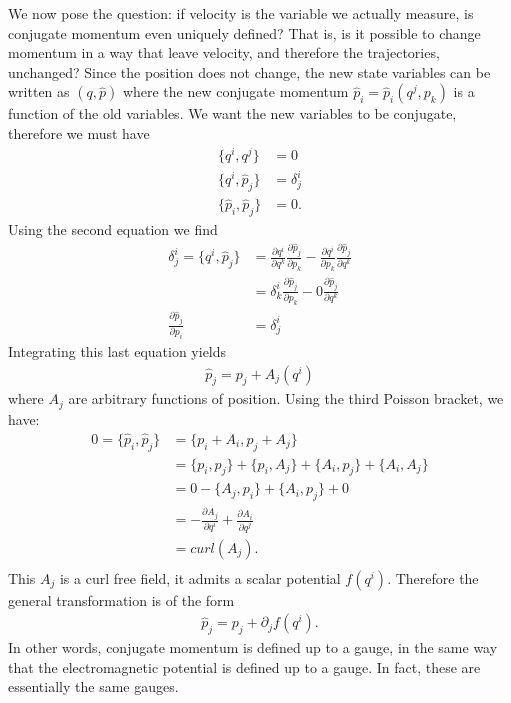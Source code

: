 We now pose the question: if velocity is the variable we actually measure, is conjugate momentum even uniquely defined? That is, is it possible to change momentum in a way that leave velocity, and therefore the trajectories, unchanged? Since the position does not change, the new state variables can be written as $(q, \hat{p})$ where the new conjugate momentum $\hat{p}_i = \hat{p}_i(q^j, p_k)$ is a function of the old variables. We want the new variables to be conjugate, therefore we must have
\begin{equation}
	\begin{aligned}
		\{q^i, q^j\} &= 0 \\
		\{q^i, \hat{p}_j\} &= \delta^i_j \\
		\{\hat{p}_i, \hat{p}_j\} &= 0 .
	\end{aligned}
\end{equation}
Using the second equation we find
\begin{equation}
	\begin{aligned}
		\delta^i_j =\{q^i, \hat{p}_j\} &= \frac{\partial q^i}{\partial q^k} \frac{\partial \hat{p}_j}{\partial p_k} - \frac{\partial q^i}{\partial p_k} \frac{\partial \hat{p}_j}{\partial q^k} \\
		&= \delta^i_k \frac{\partial \hat{p}_j}{\partial p_k} - 0 \frac{\partial \hat{p}_j}{\partial q^k} \\
		\frac{\partial \hat{p}_j}{\partial p_i} &= \delta^i_j
	\end{aligned}
\end{equation}
Integrating this last equation yields
\begin{equation}\label{rp-cm-gaugeChange}
	\begin{aligned}
		\hat{p}_j = p_j + A_j(q^i)
	\end{aligned}
\end{equation}
where $A_j$ are arbitrary functions of position. Using the third Poisson bracket, we have:
\begin{equation}
	\begin{aligned}
		0 = \{\hat{p}_i, \hat{p}_j\} &= \{p_i + A_i, p_j + A_j\} \\
		&= \{p_i, p_j \} + \{p_i , A_j\} + \{A_i, p_j \} + \{A_i, A_j\} \\
		&= 0 - \{A_j, p_i\} + \{A_i, p_j \} + 0 \\
		&= - \frac{\partial A_j}{\partial q^i} + \frac{\partial A_i}{\partial q^j} \\
		&= curl(A_j). \\
	\end{aligned}
\end{equation}
This $A_j$ is a curl free field, it admits a scalar potential $f(q^i)$. Therefore the general transformation is of the form
\begin{equation}
	\begin{aligned}
		\hat{p}_j = p_j + \partial_j f(q^i).
	\end{aligned}
\end{equation}
In other words, conjugate momentum is defined up to a gauge, in the same way that the electromagnetic potential is defined up to a gauge. In fact, these are essentially the same gauges.

